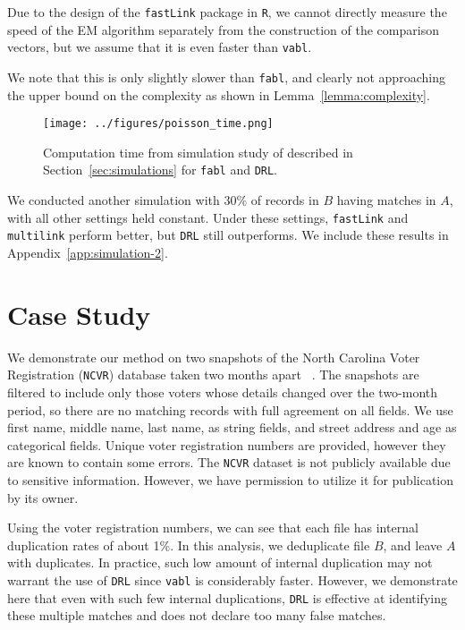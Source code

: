 \documentclass[12pt,letterpaper]{article}
\newcommand{\1}[1]{\mathbb{I}\!\left[#1\right]} %
\begin{document}
Due to the design of the \texttt{fastLink} package in \texttt{R}, we cannot directly measure the speed of the EM algorithm separately from the construction of the comparison vectors, but we assume that it is even faster than \texttt{vabl}.


We note that this is only slightly slower than \texttt{fabl}, and clearly not approaching the upper bound on the complexity as shown in Lemma~\ref{lemma:complexity}.

\begin{figure}
	\centering
	\texttt{[image: ../figures/poisson\_time.png]}
	\caption{Computation time from simulation study of described in Section~\ref{sec:simulations} for \texttt{fabl} and \texttt{DRL}.}
	\label{fig:sim-time}
\end{figure}

We conducted another simulation with 30\% of records in $B$ having matches in $A$, with all other settings held constant. Under these settings, \texttt{fastLink} and \texttt{multilink} perform better, but \texttt{DRL} still outperforms. We include these results in Appendix~\ref{app:simulation-2}.



\section{Case Study}\label{sec:case-study}

We demonstrate our method on two snapshots of the North Carolina Voter Registration (\texttt{NCVR}) database taken two months apart ~\citep{christen_preparation_2014}. The snapshots are filtered to include only those voters whose details changed over the two-month period, so there are no matching records with full agreement on all fields. We use first name, middle name, last name, as string fields, and street address and age as categorical fields. Unique voter registration numbers are provided, however they are known to contain some errors. The \texttt{NCVR} dataset is not publicly available due to sensitive information. However, we have permission to utilize it for publication by its owner.

Using the voter registration numbers, we can see that each file has internal duplication rates of about 1\%. In this analysis, we deduplicate file $B$, and leave $A$ with duplicates. In practice, such low amount of internal duplication may not warrant the use of \texttt{DRL} since \texttt{vabl} is considerably faster. However, we demonstrate here that even with such few internal duplications, \texttt{DRL} is effective at identifying these multiple matches and does not declare too many false matches. 
\end{document}
